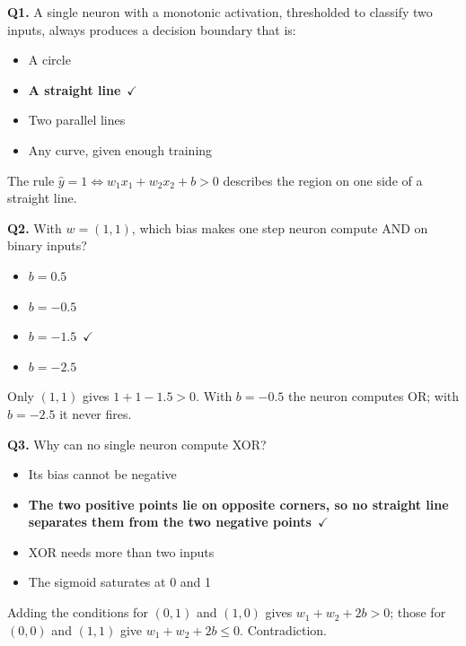 \documentclass[11pt]{article}
\begin{document}
{\small

\noindent\textbf{Q1.} A single neuron with a monotonic activation, thresholded to classify two inputs, always produces a decision boundary that is:\begin{itemize}[leftmargin=2.2em,itemsep=0pt,topsep=1pt]\item[A.] A circle\item[\textbf{B.}] \textbf{A straight line}~{\color{GrnN}$\checkmark$}\item[C.] Two parallel lines\item[D.] Any curve, given enough training\end{itemize} The rule $\hat y=1\iff w_1x_1+w_2x_2+b>0$ describes the region on one side of a straight line.\par\medskip

\noindent\textbf{Q2.} With $w=(1,1)$, which bias makes one step neuron compute AND on binary inputs?\begin{itemize}[leftmargin=2.2em,itemsep=0pt,topsep=1pt]\item[A.] $b=0.5$\item[B.] $b=-0.5$\item[\textbf{C.}] \textbf{$b=-1.5$}~{\color{GrnN}$\checkmark$}\item[D.] $b=-2.5$\end{itemize} Only $(1,1)$ gives $1+1-1.5>0$. With $b=-0.5$ the neuron computes OR; with $b=-2.5$ it never fires.\par\medskip

\noindent\textbf{Q3.} Why can no single neuron compute XOR?\begin{itemize}[leftmargin=2.2em,itemsep=0pt,topsep=1pt]\item[A.] Its bias cannot be negative\item[\textbf{B.}] \textbf{The two positive points lie on opposite corners, so no straight line separates them from the two negative points}~{\color{GrnN}$\checkmark$}\item[C.] XOR needs more than two inputs\item[D.] The sigmoid saturates at 0 and 1\end{itemize} Adding the conditions for $(0,1)$ and $(1,0)$ gives $w_1+w_2+2b>0$; those for $(0,0)$ and $(1,1)$ give $w_1+w_2+2b\le0$. Contradiction.\par\medskip

}
\end{document}
